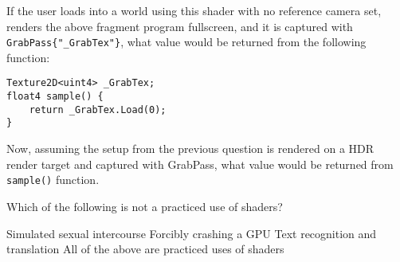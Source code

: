 \documentclass{exam}
\begin{document}
\begin{questions}
If the user loads into a world using this shader with no reference camera set, renders the above fragment program fullscreen, and it is captured with \texttt{GrabPass\{"\_GrabTex"\}}, what value would be returned from the following function:

\begin{verbatim}
Texture2D<uint4> _GrabTex;
float4 sample() {
    return _GrabTex.Load(0);
}
\end{verbatim}

\begin{checkboxes}
\end{checkboxes}

\question Now, assuming the setup from the previous question is rendered on a HDR render target and captured with GrabPass{}, what value would be returned from \texttt{sample()} function.

\begin{checkboxes}
\end{checkboxes}

\question Which of the following is not a practiced use of shaders?
\begin{checkboxes}
\choice Simulated sexual intercourse
\choice Forcibly crashing a GPU
\choice Text recognition and translation
\choice All of the above are practiced uses of shaders
\end{checkboxes}

\end{questions}
\end{document}
